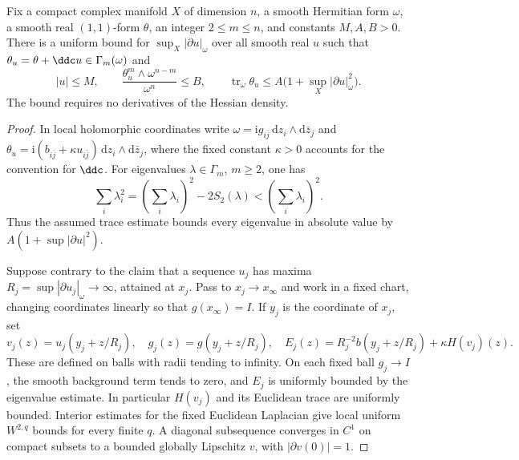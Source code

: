 \begin{proposition}\label{draft:596-hessian-trace-to-gradient}
Fix a compact complex manifold $X$ of dimension $n$, a smooth Hermitian form $\omega$, a smooth real $(1,1)$-form $\theta$, an integer $2\leq m\leq n$, and constants $M,A,B>0$.
There is a uniform bound for $\sup_X|\partial u|_\omega$ over all smooth real $u$ such that $\theta_u=\theta+\ddc u\in\Gamma_m(\omega)$ and
\[
 |u|\leq M,\qquad
 \frac{\theta_u^m\wedge\omega^{n-m}}{\omega^n}\leq B,
 \qquad
 \operatorname{tr}_\omega\theta_u
       \leq A\bigl(1+\sup_X|\partial u|_\omega^2\bigr).
\]
The bound requires no derivatives of the Hessian density.
\end{proposition}
\begin{proof}
In local holomorphic coordinates write $\omega=\mathrm i g_{i\bar j}\,\mathrm dz_i\wedge\mathrm d\bar z_j$ and $\theta_u=\mathrm i(b_{i\bar j}+\kappa u_{i\bar j})\,\mathrm dz_i\wedge\mathrm d\bar z_j$, where the fixed constant $\kappa>0$ accounts for the convention for $\ddc$.
For eigenvalues $\lambda\in\Gamma_m$, $m\geq2$, one has
\[
 \sum_i\lambda_i^2
  =\left(\sum_i\lambda_i\right)^2-2S_2(\lambda)
  <\left(\sum_i\lambda_i\right)^2.
\]
Thus the assumed trace estimate bounds every eigenvalue in absolute value by $A(1+\sup|\partial u|^2)$.

Suppose contrary to the claim that a sequence $u_j$ has maxima $R_j=\sup|\partial u_j|_\omega\to\infty$, attained at $x_j$. Pass to $x_j\to x_\infty$ and work in a fixed chart, changing coordinates linearly so that $g(x_\infty)=I$. If $y_j$ is the coordinate of $x_j$, set
\[
 v_j(z)=u_j(y_j+z/R_j),\quad
 g_j(z)=g(y_j+z/R_j),\quad
 E_j(z)=R_j^{-2}b(y_j+z/R_j)+\kappa H(v_j)(z).
\]
These are defined on balls with radii tending to infinity. On each fixed ball $g_j\to I$, the smooth background term tends to zero, and $E_j$ is uniformly bounded by the eigenvalue estimate. In particular $H(v_j)$ and its Euclidean trace are uniformly bounded.
Interior estimates for the fixed Euclidean Laplacian give local uniform $W^{2,q}$ bounds for every finite $q$. A diagonal subsequence converges in $C^1$ on compact subsets to a bounded globally Lipschitz $v$, with $|\partial v(0)|=1$.


\end{proof}
